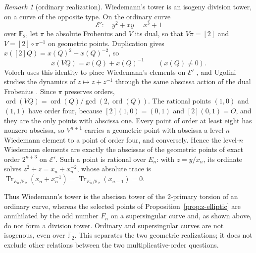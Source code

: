 \documentclass[11pt]{article}
\theoremstyle{definition}
\theoremstyle{remark}
\newtheorem{remark}[theorem]{Remark}
\begin{document}
\begin{remark}[ordinary realization]\label{rem:z-ordinary}
Wiedemann's tower is an isogeny division tower, on a curve of the opposite
type.  On the ordinary curve
\[
 \mathcal E'\colon\quad y^2+xy=x^3+1
\]
over $\mathbb F_2$, let $\pi$ be absolute Frobenius and $V$ its dual, so
that $V\pi=[2]$ and $V=[2]\circ\pi^{-1}$ on geometric points.  Duplication
gives $x([2]Q)=x(Q)^2+x(Q)^{-2}$, so
\[
 x(VQ)=x(Q)+x(Q)^{-1}\qquad(x(Q)\ne0).
\]
Voloch uses this identity to place Wiedemann's elements on $\mathcal E'$
\cite[Section~4]{voloch2010}, and Ugolini studies the dynamics of
$z\mapsto z+z^{-1}$ through the same abscissa action of the dual Frobenius
\cite{ugolini2012}.  Since $\pi$ preserves
orders, $\operatorname{ord}(VQ)=\operatorname{ord}(Q)/\gcd(2,\operatorname{ord}(Q))$.
The rational points $(1,0)$ and $(1,1)$ have order four, because
$[2](1,0)=(0,1)$ and $[2](0,1)=O$, and they are the only points with
abscissa one.  Every point of order at least eight has nonzero abscissa, so
$V^{n+1}$ carries a geometric point with abscissa a level-$n$ Wiedemann
element to a point of order four, and conversely.  Hence the level-$n$
Wiedemann elements are exactly the abscissas of the geometric points of
exact order $2^{n+3}$ on $\mathcal E'$.  Such a point is rational over
$E_n$: with $z=y/x_n$, its ordinate solves $z^2+z=x_n+x_n^{-2}$, whose
absolute trace is
$\operatorname{Tr}_{E_n/\mathbb F_2}(x_n+x_n^{-1})
 =\operatorname{Tr}_{E_n/\mathbb F_2}(x_{n-1})=0$.

Thus Wiedemann's tower is the abscissa tower of the $2$-primary torsion of
an ordinary curve, whereas the selected points of
Proposition~\ref{prop:z-elliptic} are annihilated by the odd number $F_n$ on
a supersingular curve and, as shown above, do not form a division tower.
Ordinary and supersingular curves are not isogenous, even over
$\overline{\mathbb F}_2$.  This separates the two geometric realizations; it
does not exclude other relations between the two multiplicative-order
questions.
\end{remark}
\end{document}

